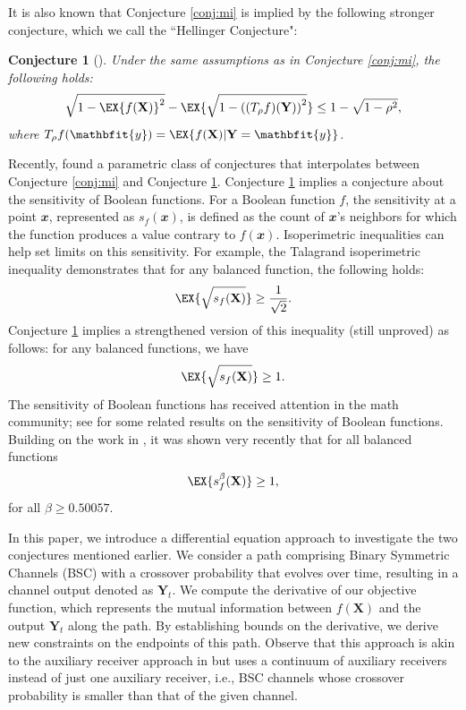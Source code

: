 \documentclass[conference,letterpaper,onecolumn]{IEEEtran}
\theoremstyle{plain}%
\newcommand{\bY}{\mathbf{Y}}
\newcommand{\by}{\mathbfit{y}}
\newcommand{\bX}{\mathbf{X}}
\newcommand{\bx}{\mathbfit{x}}
\newtheorem{conj}{Conjecture}
\begin{document}
It is also known that Conjecture \ref{conj:mi} is implied by the following stronger conjecture, which we call the ``Hellinger Conjecture":
\begin{conj}[\hspace{1sp}\cite{abcjn17}]
    \label{conj:hel}
    Under the same assumptions as in Conjecture \ref{conj:mi}, the following holds:
    \begin{equation}
    \sqrt{1 - \EX{f(\bX)}^2} - \EX{\sqrt{1 - \left((T_\rho f)(\mathbf{Y})\right)^2}} \leq 1 - \sqrt{1 - \rho^2},
    \end{equation}
    where $T_\rho f(\by)=\EX{f(\bX) | \mathbf{Y}=\by}$.
\end{conj}
Recently, \cite{chen2024optimality} found a parametric class of conjectures that interpolates between Conjecture \ref{conj:mi} and Conjecture \ref{conj:hel}. Conjecture \ref{conj:hel} implies a conjecture about the sensitivity of Boolean functions. For a Boolean function \( f \), the sensitivity at a point \( \bx \), represented as \( s_f(\bx) \), is defined as the count of \( \bx \)'s neighbors for which the function produces a value contrary to \( f(\bx) \). Isoperimetric inequalities can help set limits on this sensitivity. For example, the Talagrand isoperimetric inequality demonstrates that for any balanced function, the following holds:
{ \[
\EX{\sqrt{s_f(\bX)}} \geq \frac{1}{\sqrt{2}}.
\]}
Conjecture \ref{conj:hel} implies a strengthened version of this inequality (still unproved) as follows: for any balanced functions, we have
{ \begin{align*}
\EX{\sqrt{s_f(\bX)}} \geq 1.
\end{align*}}
The sensitivity of Boolean functions has received attention in the math community; see \cite{bob97,beltran2023sharp,kahn2019isoperimetric,dir24} for some related results on the sensitivity of Boolean functions. Building on the work in \cite{kahn2019isoperimetric}, it was shown very recently that for all balanced functions \begin{align*}
\EX{s_f^\beta(\bX)} \geq 1,
\end{align*}
for all $\beta \geq 0.50057$.

In this paper, we introduce a differential equation approach to investigate the two conjectures mentioned earlier. We consider a path comprising Binary Symmetric Channels (BSC) with a crossover probability that evolves over time, resulting in a channel output denoted as $\bY_t$. We compute the derivative of our objective function, which represents the mutual information between $f(\bX)$ and the output $\bY_t$ along the path. By establishing bounds on the derivative, we derive new constraints on the endpoints of this path. Observe that this approach is akin to the auxiliary receiver approach in \cite{gon21} but uses a continuum of auxiliary receivers instead of just one auxiliary receiver, i.e., BSC channels whose crossover probability is smaller than that of the given channel. 
\end{document}
